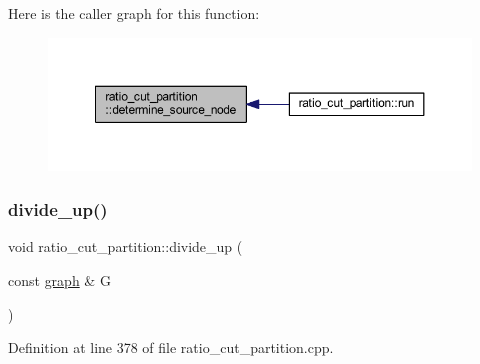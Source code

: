 Here is the caller graph for this function\+:\nopagebreak
\begin{figure}[H]
\begin{center}
\leavevmode
\includegraphics[width=350pt]{classratio__cut__partition_a7d3397f85318f781fbae287037e0ae33_icgraph}
\end{center}
\end{figure}
\mbox{\label{classratio__cut__partition_a04bea9656188ed01612106d797d1fd47}} 
\subsubsection{\texorpdfstring{divide\+\_\+up()}{divide\_up()}}
{\footnotesize\ttfamily void ratio\+\_\+cut\+\_\+partition\+::divide\+\_\+up (\begin{DoxyParamCaption}\item[{const \mbox{\hyperlink{classgraph}{graph}} \&}]{G }\end{DoxyParamCaption})\hspace{0.3cm}{\ttfamily [protected]}}



Definition at line 378 of file ratio\+\_\+cut\+\_\+partition.\+cpp.


